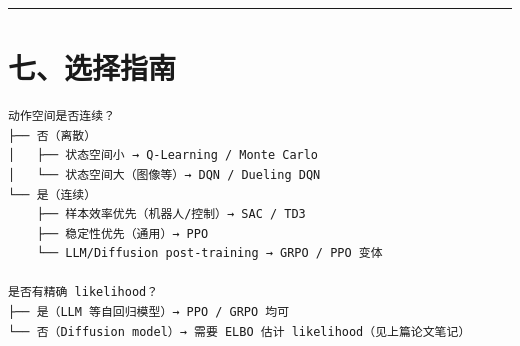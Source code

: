 \hrule

\section{七、选择指南}

\begin{verbatim}
动作空间是否连续？
├── 否（离散）
│   ├── 状态空间小 → Q-Learning / Monte Carlo
│   └── 状态空间大（图像等）→ DQN / Dueling DQN
└── 是（连续）
    ├── 样本效率优先（机器人/控制）→ SAC / TD3
    ├── 稳定性优先（通用）→ PPO
    └── LLM/Diffusion post-training → GRPO / PPO 变体

是否有精确 likelihood？
├── 是（LLM 等自回归模型）→ PPO / GRPO 均可
└── 否（Diffusion model）→ 需要 ELBO 估计 likelihood（见上篇论文笔记）
\end{verbatim}

\begin{verbatim}

\end{verbatim}
